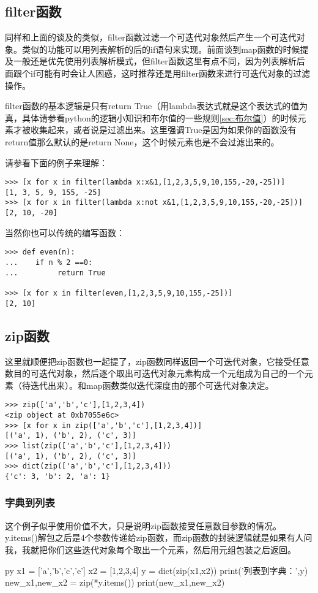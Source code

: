\documentclass[12pt,oneside]{book}
\begin{document}
\begin{common-format}
\subsection{filter函数}
同样和上面的谈及的类似，filter函数过滤一个可迭代对象然后产生一个可迭代对象。类似的功能可以用列表解析的后的if语句来实现。前面谈到map函数的时候提及一般还是优先使用列表解析模式，但filter函数这里有点不同，因为列表解析后面跟个if可能有时会让人困惑，这时推荐还是用filter函数来进行可迭代对象的过滤操作。

filter函数的基本逻辑是只有return True（用lambda表达式就是这个表达式的值为真，具体请参看python的逻辑小知识和布尔值的一些规则\ref{sec:布尔值}）的时候元素才被收集起来，或者说是过滤出来。这里强调True是因为如果你的函数没有return值那么默认的是return None，这个时候元素也是不会过滤出来的。

请参看下面的例子来理解：
\begin{Verbatim}
>>> [x for x in filter(lambda x:x&1,[1,2,3,5,9,10,155,-20,-25])]
[1, 3, 5, 9, 155, -25]
>>> [x for x in filter(lambda x:not x&1,[1,2,3,5,9,10,155,-20,-25])]
[2, 10, -20]
\end{Verbatim}


当然你也可以传统的编写函数：
\begin{Verbatim}
>>> def even(n):
...    if n % 2 ==0:
...         return True

>>> [x for x in filter(even,[1,2,3,5,9,10,155,-25])]
[2, 10]
\end{Verbatim}

\subsection{zip函数}
这里就顺便把zip函数也一起提了，zip函数同样返回一个可迭代对象，它接受任意数目的可迭代对象，然后逐个取出可迭代对象元素构成一个元组成为自己的一个元素（待迭代出来）。和map函数类似迭代深度由的那个可迭代对象决定。
\begin{Verbatim}
>>> zip(['a','b','c'],[1,2,3,4])
<zip object at 0xb7055e6c>
>>> [x for x in zip(['a','b','c'],[1,2,3,4])]
[('a', 1), ('b', 2), ('c', 3)]
>>> list(zip(['a','b','c'],[1,2,3,4]))
[('a', 1), ('b', 2), ('c', 3)]
>>> dict(zip(['a','b','c'],[1,2,3,4]))
{'c': 3, 'b': 2, 'a': 1}
\end{Verbatim}

\subsubsection{字典到列表}
这个例子似乎使用价值不大，只是说明zip函数接受任意数目参数的情况。y.items()解包之后是4个参数传递给zip函数，而zip函数的封装逻辑就是如果有人问我，我就把你们这些迭代对象每个取出一个元素，然后用元组包装之后返回。
\begin{xverbatim}[129]{py}
x1 = ['a','b','c','e']
x2 = [1,2,3,4]
y = dict(zip(x1,x2))
print('列表到字典：',y)
new_x1,new_x2 = zip(*y.items())
print(new_x1,new_x2)
\end{xverbatim}


\end{common-format}
\end{document}
